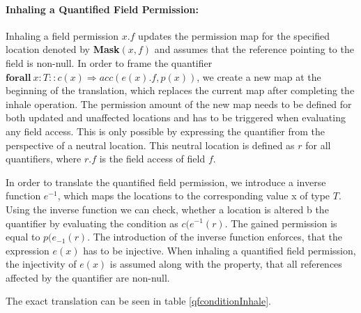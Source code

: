 \documentclass[12pt]{article}
\begin{document}
\paragraph{Inhaling a Quantified Field Permission: }
Inhaling a field permission \(x.f\) updates the permission map for the specified location denoted by \textbf{Mask}\((x, f)\) and assumes  that the reference pointing to the field is non-null. In order to frame the quantifier \(\mathbf{forall\ } x:T :: c(x) \Rightarrow acc(e(x).f, p(x))\), we create a new map at the beginning of the translation, which replaces the current map after completing the inhale operation. The permission amount of the new map needs to be defined for both updated and unaffected locations and has to be triggered when evaluating any field access. This is only possible by expressing the quantifier from the perspective of a neutral location. This neutral location is defined as \(r\) for all quantifiers, where \(r.f\) is the field access of field \(f\). 

In order to translate the quantified field permission, we introduce a inverse function \(e^{-1}\), which maps the locations to the corresponding value x of type \(T\). Using the inverse function we can check, whether a location is altered b the quantifier by evaluating the condition as \(c(e^{-1}(r)\). The gained permission is equal to \(p(e_{-1}(r)\). 
The introduction of the inverse function enforces, that the expression \(e(x)\) has to be injective. When inhaling a quantified field permission, the injectivity of \(e(x)\) is assumed along with the property, that all references affected by the quantifier are non-null.

The exact translation can be seen in table \ref{qfconditionInhale}.
\end{document}
